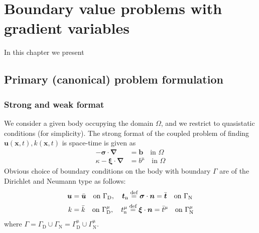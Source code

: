 
\chapter{Boundary value problems with gradient variables}


In this chapter we present 

\section{Primary (canonical) problem formulation}

\subsection{Strong and weak format}

We consider a given body occupying the domain $\Omega$, and we restrict to quasistatic conditions (for simplicity). The strong format of the coupled problem of finding $\bm{u}(\bm{x},t), k(\bm{x},t)$ is space-time is given as
\begin{subequations}\label{eq:8-208}
    \begin{align}
    - \bm{\sigma}\cdot\bm{\nabla} &= \bm{b} \quad
    \mbox{in }  \Omega
\label{eq:8-208a} \\
    \kappa - \bm{\xi}\cdot\bm{\nabla} &= b^{\mathrm \mu} \quad
    \mbox{in }  \Omega
\label{eq:8-208b}
    \end{align}
\end{subequations}
Obvious choice of boundary conditions on the body with boundary $\Gamma$ are of the Dirichlet and Neumann type as follows:
\begin{subequations}\label{eq:8-308}
    \begin{align}
    \bm{u} &= \bar{\mbox{\boldmath $u$}} \quad \mbox{on }  \Gamma_{\mathrm D}, \quad \bm{t}_{\mathrm n}\stackrel{\text{def}}{=}\bm{\sigma}\cdot\bm{n} = \bar{\mbox{\boldmath $t$}} \quad \mbox{on }  \Gamma_{\mathrm N}
\label{eq:8-308a} \\
    k &= \bar{k} \quad \mbox{on }  \Gamma_{\mathrm D}^{\mathrm \mu}, \quad t_{\mathrm n}^{\mathrm \mu}\stackrel{\text{def}}{=}\bm{\xi}\cdot\bm{n} = \bar{t}^{\mathrm \mu} \quad \mbox{on }  \Gamma_{\mathrm N}^{\mathrm \mu}
\label{eq:8-308b}
    \end{align}

\end{subequations}
where $\Gamma=\Gamma_{\mathrm D}\cup\Gamma_{\mathrm N}=\Gamma_{\mathrm D}^{\mathrm \mu}\cup\Gamma_{\mathrm N}^{\mathrm \mu}$.

